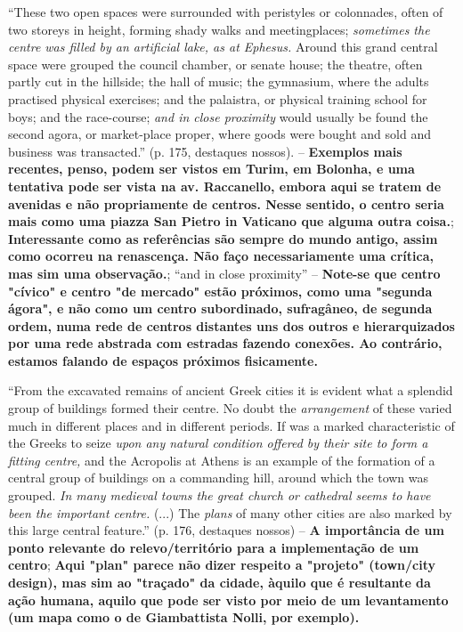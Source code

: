 \documentclass[12pt, a4paper]{book} %
\begin{document}
        ``These two open spaces were surrounded with peristyles or colonnades, often of two storeys in height, forming shady walks and meetingplaces; \textit{sometimes the centre was filled by an artificial lake, as at Ephesus.} Around this grand central space were grouped the council chamber, or senate house; the theatre, often partly cut in the hillside; the hall of music; the gymnasium, where the adults practised physical exercises; and the palaistra, or physical training school for boys; and the race-course; \textit{and in close proximity} would usually be found the second agora, or market-place proper, where goods were bought and sold and business was transacted.'' (p. 175, destaques nossos). – \textbf{Exemplos mais recentes, penso, podem ser vistos em Turim, em Bolonha, e uma tentativa pode ser vista na av. Raccanello, embora aqui se tratem de avenidas e não propriamente de centros. Nesse sentido, o centro seria mais como uma piazza San Pietro in Vaticano que alguma outra coisa.}; \textbf{Interessante como as referências são sempre do mundo antigo, assim como ocorreu na renascença. Não faço necessariamente uma crítica, mas sim uma observação.}; ``and in close proximity'' – \textbf{Note-se que centro "cívico" e centro "de mercado" estão próximos, como uma "segunda ágora", e não como um centro subordinado, sufragâneo, de segunda ordem, numa rede de centros distantes uns dos outros e hierarquizados por uma rede abstrada com estradas fazendo conexões. Ao contrário, estamos falando de espaços próximos fisicamente.}

        ``From the excavated remains of ancient Greek cities it is evident what a splendid group of buildings formed their centre. No doubt the \textit{arrangement} of these varied much in different places and in different periods. If was a marked characteristic of the Greeks to seize \textit{upon any natural condition offered by their site to form a fitting centre,} and the Acropolis at Athens is an example of the formation of a central group of buildings on a commanding hill, around which the town was grouped. \textit{In many medieval towns the great church or cathedral seems to have been the important centre.} (...) The \textit{plans} of many other cities are also marked by this large central feature.'' (p. 176, destaques nossos) – \textbf{A importância de um ponto relevante do relevo/território para a implementação de um centro}; \textbf{Aqui "plan" parece não dizer respeito a "projeto" (town/city design), mas sim ao "traçado" da cidade, àquilo que é resultante da ação humana, aquilo que pode ser visto por meio de um levantamento (um mapa como o de Giambattista Nolli, por exemplo).}
\end{document}
